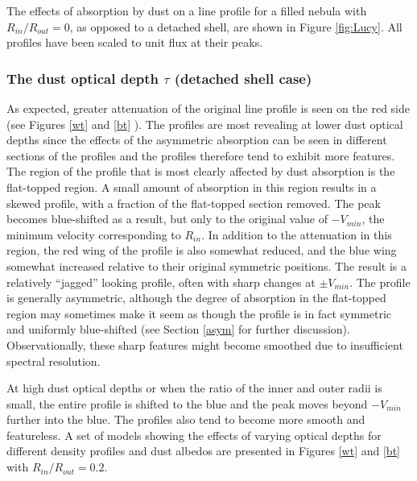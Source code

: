\documentclass[useAMS,usenatbib,usegraphicx]{mnras}
\begin{document}
The effects of absorption by dust on a line profile for a filled nebula with $R_{in}/R_{out}=0$, as opposed 
to a detached shell, are shown in Figure \ref{fig:Lucy}.  
All profiles have been scaled to unit flux at their peaks.



\subsubsection{The dust optical depth $\tau$ (detached shell case)}
\label{tau}

As expected, greater attenuation of the original line profile is seen on 
the red side (see Figures \ref{wt} and \ref{bt} ).  The profiles are most revealing at lower 
dust optical depths since the effects of the asymmetric absorption can be seen in 
different sections of the profiles and the profiles therefore tend to exhibit more features.
  The region of the profile that is 
most clearly affected by dust absorption is the flat-topped region.  A 
small amount of absorption in this region results in a skewed profile, 
with a fraction of the flat-topped section removed.  The peak becomes 
blue-shifted as a result, but only to the original value of $-V_{min}$, the minimum 
velocity corresponding to $R_{in}$. In addition to the attenuation in this region, 
the red wing of the profile is also somewhat reduced, and the blue wing 
somewhat increased relative to their original symmetric positions.  The 
result is a relatively ``jagged'' looking profile, often with sharp changes 
at $\pm V_{min}$.  The profile is generally asymmetric, although the 
degree of absorption in the flat-topped region may sometimes make it seem 
as though the profile is in fact symmetric and uniformly blue-shifted (see 
Section \ref{asym} for further discussion).  Observationally, these sharp features might become smoothed due to insufficient spectral resolution.

At high dust optical depths or when the ratio of the inner and outer radii is small, the entire profile is shifted to the blue and the 
peak moves beyond $-V_{min}$ further into the blue.  The 
profiles also tend to become more smooth and featureless.  A set of models showing 
the effects of varying optical depths for different density profiles and 
dust albedos are presented in Figures \ref{wt} and \ref{bt}  with $R_{in}/R_{out} = 0.2$.
\end{document}
